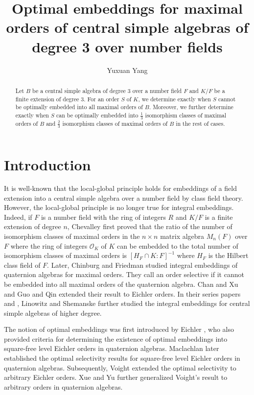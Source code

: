 \documentclass[12pt]{article}
\theoremstyle{plain}
\theoremstyle{definition}
\theoremstyle{remark}
\begin{document}
\title{Optimal embeddings for maximal orders of central simple algebras of degree 3 over number fields} 
\author{Yuxuan Yang} 
\maketitle
\begin{abstract}
Let  $B$ be a central simple algebra of degree 3 over a number field $F$ and $K/F$ be a finite extension of degree 3. For an order $S$ of $K$, we determine exactly when $S$ cannot be optimally embedded into all maximal orders of $B$. Moreover, we further determine exactly when $S$ can be optimally embedded into $\frac{1}{3}$ isomorphism classes of maximal orders of $B$ and $\frac{2}{3}$ isomorphism classes of maximal orders of $B$ in the rest of cases.  
\end{abstract}
\section{Introduction}
It is well-known that the local-global principle holds for embeddings of a field extension into a central simple algebra over a number field by class field theory. However, the local-global principle is no longer true for integral embeddings. Indeed, if $F$ is a number field with the ring of integers $R$ and $K/F$ is a finite extension of degree $n$, Chevalley \cite{Chevalley1936} first proved that the ratio of the number of isomorphism classes of maximal orders in the $n\times n$ matrix algebra $M_n(F)$ over $F$ where the ring of integers $\mathcal{O}_K$ of $K$ can be embedded to the total number of isomorphism classes of maximal orders is $[H_F\cap K: F]^{-1}$ where $H_F$ is the Hilbert class field of $F$. Later, Chinburg and Friedman \cite{chinburg1999embedding} studied integral embeddings of quaternion algebras for maximal orders. They call an order selective if it cannot be embedded into all maximal orders of the quaternion algebra. Chan and Xu \cite{chan2004representations} and Guo and Qin \cite{guo2004embedding} extended their result to Eichler orders. In their series papers \cite{Linowitz2012} and \cite{LinowitzShemanske2017}, Linowitz and Shemanske further studied the integral embeddings for central simple algebras of higher degree. 

 The notion of optimal embeddings was first introduced by Eichler \cite{Eichler1955}, who also provided criteria for determining the existence of optimal embeddings into square-free level Eichler orders in quaternion algebras. Maclachlan \cite{MACLACHLAN20082852} later established the optimal selectivity results for square-free level Eichler orders in quaternion algebras. Subsequently, Voight \cite{voight2021quaternion} extended the optimal selectivity to arbitrary Eichler orders. Xue and Yu \cite{XUE2024166} further generalized Voight’s result to arbitrary orders in quaternion algebras.
\end{document}
